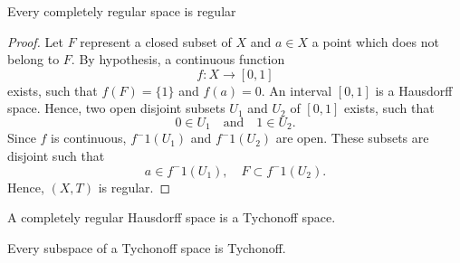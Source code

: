 \documentclass[12pt]{article} %
\begin{document}
\begin{theorem}
    Every completely regular space is regular \label{comples}
\end{theorem}
\begin{proof}
 Let $F$ represent a closed subset of $X$ and $a\in X$ a point which does not belong to $F$. By hypothesis, a continuous function
 $$ f: X \to [0,1]$$
 exists, such that $f(F) = \{1\}$ and $f(a) =0$. An interval $[0,1]$ is a Hausdorff space. Hence, two open disjoint subsets $U_1$ and $U_2$ of $[0,1]$ exists, such that
 $$ 0\in U_1 \quad \text{and} \quad  1 \in U_2.$$
 Since $f$ is continuous, $f^-1(U_1)$ and $f^-1(U_2)$ are open. These subsets are disjoint such that
 $$ a\in f^-1(U_1), \quad F\subset f^-1(U_2).$$
 Hence, $(X,T)$ is regular.
\end{proof}

\begin{definition}
A completely regular Hausdorff space is a  Tychonoff space.
\end{definition}

\begin{theorem}
    \parencite{Dugundji1966} Every subspace of a Tychonoff space is Tychonoff. 
\end{theorem}




\newpage
{}		
	\begingroup
            \printbibliography
        \endgroup
\end{document}
